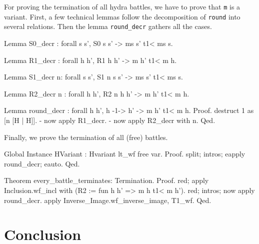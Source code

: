     For proving the termination of all hydra battles, we have to prove that
    \texttt{m} is a variant. First, a few technical lemmas follow the decomposition of \texttt{round} into several relations. Then the lemma \texttt{round\_decr} gathers all the cases.

    \label{sect:variant-decr}

    \begin{Coqsrc}
    Lemma S0_decr :
      forall s s', S0  s s' -> ms s' t1< ms s.
    \end{Coqsrc}

    \begin{Coqsrc}
    Lemma R1_decr : forall h h',
                      R1 h h' -> m h' t1< m h.
    \end{Coqsrc}

    \begin{Coqsrc}
    Lemma S1_decr n:
      forall s s', S1 n s s' -> ms s' t1<  ms s.
    \end{Coqsrc}

    \begin{Coqsrc}
    Lemma R2_decr n : forall h h', R2 n h h' -> m h'  t1< m h.
    \end{Coqsrc}


    \begin{Coqsrc}
    Lemma round_decr : forall h h', h -1-> h' -> m h' t1< m h.
    Proof.
       destruct 1 as [n [H | H]].
       -  now apply R1_decr.
       -  now apply R2_decr with n.
    Qed.
    \end{Coqsrc}

    Finally, we prove the termination of all (free) battles.

    \label{thm:every-battle-terminates}

    \begin{Coqsrc}
    Global Instance HVariant : Hvariant lt_wf free var.
    Proof.
     split; intros; eapply round_decr; eauto.
    Qed.

    Theorem every_battle_terminates: Termination.
    Proof. 
      red; apply Inclusion.wf_incl with 
             (R2 := fun h h' =>  m h t1< m h').
       red; intros;  now apply round_decr.
       apply Inverse_Image.wf_inverse_image, T1_wf.
    Qed.
    \end{Coqsrc}


    \section*{Conclusion}


